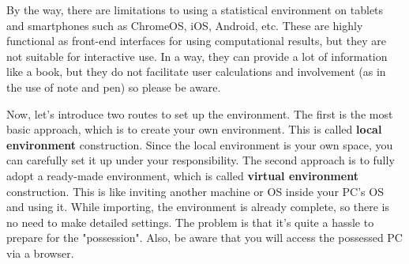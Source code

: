 \documentclass{ltjsbook}
\begin{document}
By the way, there are limitations to using a statistical environment on tablets and smartphones such as ChromeOS, iOS, Android, etc. These are highly functional as front-end interfaces for using computational results, but they are not suitable for interactive use. In a way, they can provide a lot of information like a book, but they do not facilitate user calculations and involvement (as in the use of note and pen) so please be aware.

Now, let's introduce two routes to set up the environment. The first is the most basic approach, which is to create your own environment. This is called \textbf{local environment} construction. Since the local environment is your own space, you can carefully set it up under your responsibility. The second approach is to fully adopt a ready-made environment, which is called \textbf{virtual environment} construction. This is like inviting another machine or OS inside your PC's OS and using it. While importing, the environment is already complete, so there is no need to make detailed settings. The problem is that it's quite a hassle to prepare for the "possession". Also, be aware that you will access the possessed PC via a browser.
\end{document}
